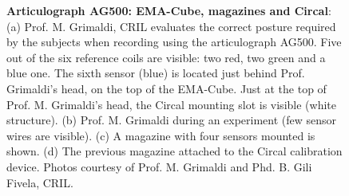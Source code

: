 \begin{figure}
	\centering
		\hspace{0.05\textwidth}

		\hspace{0.05\textwidth}

	\caption[Articulograph AG500]{\textbf{Articulograph AG500: EMA-Cube, magazines and Circal}:
	(a) Prof. M. Grimaldi, CRIL evaluates the correct posture required by the
	subjects when recording using the articulograph AG500.
	Five out of the six reference coils are visible: two red, two green and a
	blue one. The sixth sensor (blue) is located just behind Prof. Grimaldi's
	head, on the top of the EMA-Cube.
	Just at the top of Prof. M. Grimaldi's head, the Circal mounting slot is
	visible (white structure).
	(b) Prof. M. Grimaldi during an experiment (few sensor wires are visible).
	(c) A magazine with four sensors mounted is shown. 
	(d) The previous magazine attached to the Circal calibration device.
	Photos courtesy of Prof. M. Grimaldi and Phd. B. Gili Fivela, CRIL.}
	\label{fig:linguometer:ag:intro}
\end{figure}
